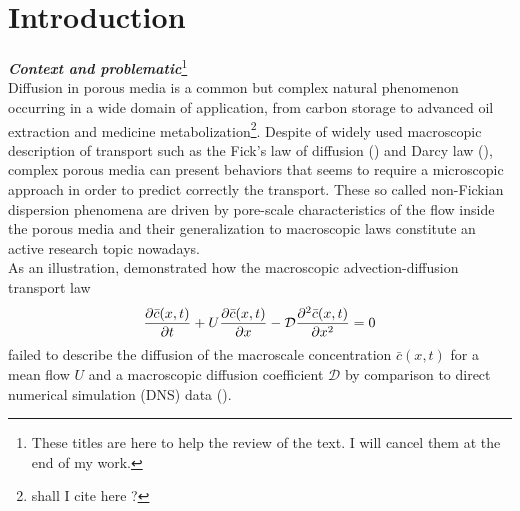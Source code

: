 \chapter{Introduction}
\textit{\textbf{Context and problematic}}\footnote{These titles are here to help the review of the text. I will cancel them at the end of my work.}\\
Diffusion in porous media is a common but complex natural phenomenon occurring in a wide domain of application, from carbon storage to advanced oil extraction and medicine metabolization\footnote{shall I cite here ?}.
Despite of widely used macroscopic description of transport such as the Fick's law of diffusion (\citet{Fick1855}) and Darcy law (\citet{Darcy1856}), complex porous media can present behaviors that seems to require a microscopic approach in order to predict correctly the transport.
These so called non-Fickian dispersion phenomena are driven by pore-scale characteristics of the flow inside the porous media and their generalization to macroscopic laws constitute an active research topic nowadays. \\
As an illustration, \citet{Dentz2017} demonstrated how the macroscopic advection-diffusion transport law
\begin{equation}
	\pdv{\bar{c}(x,t)}{t}+U\pdv{\bar{c}(x,t)}{x}-\mathcal{D}\pdv[2]{\bar{c}(x,t)}{x}=0
\label{eq:adv_diff}
\end{equation}
failed to describe the diffusion of the macroscale concentration $\bar{c}(x,t)$ for a mean flow $U$ and a macroscopic diffusion coefficient $\mathcal{D}$ by comparison to direct numerical simulation (DNS) data (\citet[Fig. 3]{Dentz2017}).\\


